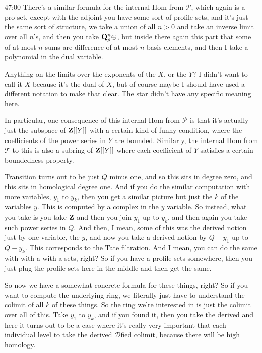 \begin{unfinished}{47:00}
There's a similar formula for the internal Hom from $\mathcal{P}$, which again is a pro-set, except with the adjoint you have some sort of profile sets, and it's just the same sort of structure, we take a union of all $n > 0$ and take an inverse limit over all $n$'s, and then you take $\mathbf Q_p^n \oplus$, but inside there again this part that some of at most $n$ sums are difference of at most $n$ basis elements, and then I take a polynomial in the dual variable.

Anything on the limits over the exponents of the $X$, or the $Y$? I didn't want to call it $X$ because it's the dual of $X$, but of course maybe I should have used a different notation to make that clear. The star didn't have any specific meaning here.

In particular, one consequence of this internal Hom from $\mathcal{P}$ is that it's actually just the subspace of $\mathbf Z[[Y]]$ with a certain kind of funny condition, where the coefficients of the power series in $Y$ are bounded. Similarly, the internal Hom from $\mathcal{T}$ to this is also a subring of $\mathbf Z[[Y]]$ where each coefficient of $Y$ satisfies a certain boundedness property.

Transition turns out to be just $Q$ minus one, and so this sits in degree zero, and this sits in homological degree one. And if you do the similar computation with more variables, $y_1$ to $y_k$, then you get a similar picture but just the $k$ of the variables $y$. This is computed by a complex in the $y$ variable. So instead, what you take is you take $\mathbf Z$ and then you join $y_1$ up to $y_k$, and then again you take such power series in $Q$. And then, I mean, some of this was the derived notion just by one variable, the $y$, and now you take a derived notion by $Q - y_1$ up to $Q - y_k$. This corresponds to the Tate filtration. And I mean, you can do the same with with a with a sets, right? So if you have a profile sets somewhere, then you just plug the profile sets here in the middle and then get the same.

So now we have a somewhat concrete formula for these things, right? So if you want to compute the underlying ring, we literally just have to understand the colimit of all $k$ of these things. So the ring we're interested in is just the colimit over all of this. Take $y_1$ to $y_k$, and if you found it, then you take the derived and here it turns out to be a case where it's really very important that each individual level to take the derived $\mathcal{D}$fied colimit, because there will be high homology.


\end{unfinished}
